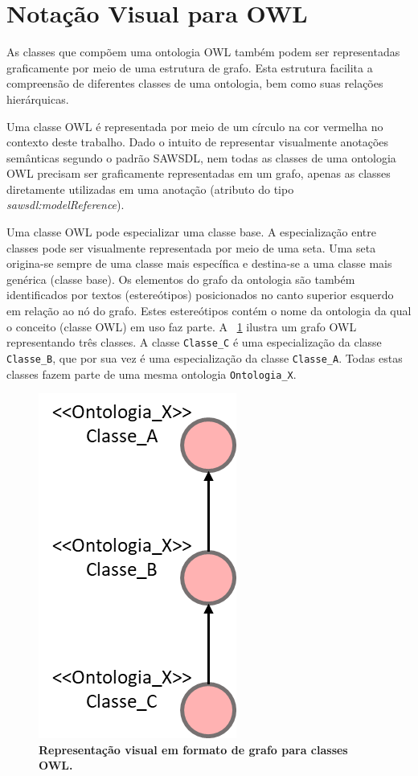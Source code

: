 \section{Notação Visual para OWL}\label{3-notacao-visual-owl}

As classes que compõem uma ontologia OWL também podem ser representadas graficamente por meio de uma estrutura de grafo. Esta estrutura facilita a compreensão de diferentes classes de uma ontologia, bem como suas relações hierárquicas.

Uma classe OWL é representada por meio de um círculo na cor vermelha no contexto deste trabalho. Dado o intuito de representar visualmente anotações semânticas segundo o padrão SAWSDL, nem todas as classes de uma ontologia OWL precisam ser graficamente representadas em um grafo, apenas as classes diretamente utilizadas em uma anotação (atributo do tipo \textit{sawsdl:modelReference}).

Uma classe OWL pode especializar uma classe base. A especialização entre classes pode ser visualmente representada por meio de uma seta. Uma seta origina-se sempre de uma classe mais específica e destina-se a uma classe mais genérica (classe base). Os elementos do grafo da ontologia são também identificados por textos (estereótipos) posicionados no canto superior esquerdo em relação ao nó do grafo. Estes estereótipos contém o nome da ontologia da qual o conceito (classe OWL) em uso faz parte. A \figurename~\ref{fig:grafo-owl} ilustra um grafo OWL representando três classes. A classe \texttt{Classe\_C} é uma especialização da classe \texttt{Classe\_B}, que por sua vez é uma especialização da classe \texttt{Classe\_A}. Todas estas classes fazem parte de uma mesma ontologia \texttt{Ontologia\_X}.

\begin{figure}[h]
    \includegraphics[scale=0.5]{3-notacao-visual-sawsdl/imagens/grafo-owl.png}
    \centering
    \caption[Representação visual em formato de grafo para classes OWL]{\textbf{Representação visual em formato de grafo para classes OWL.}}
    \label{fig:grafo-owl}
\end{figure}

